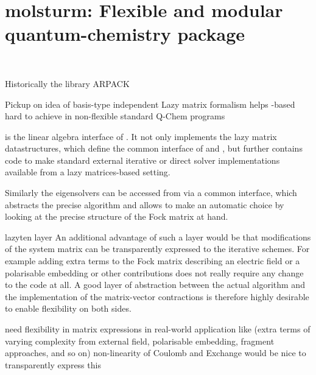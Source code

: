 \chapter{molsturm: Flexible and modular quantum-chemistry package}
\label{ch:Molsturm}
 \\

Historically the \fortran library ARPACK~\cite{Lehoucq1998}

Pickup on idea of basis-type independent \SCF
Lazy matrix formalism helps
\contraction-based \SCF hard to achieve in non-flexible standard
Q-Chem programs

\lazyten is the linear algebra interface of \molsturm.
It not only implements the lazy matrix datastructures,
which define the common interface of \gint and \gscf,
but further contains code to make standard external
iterative or direct solver implementations available
from a lazy matrices-based setting.

Similarly the eigensolvers can be accessed from \gscf via a common interface,
which abstracts the precise algorithm and allows \lazyten to make an automatic
choice by looking at the precise structure of the Fock matrix at hand.










lazyten layer
An additional advantage of such a layer would be that
modifications of the system matrix can be transparently expressed
to the iterative schemes.
For example adding extra terms to the Fock matrix
describing an electric field or a polarisable embedding
or other contributions does not really require
any change to the \SCF code at all.
A good layer of abstraction between the actual \SCF algorithm
and the implementation of the matrix-vector contractions
is therefore highly desirable to enable flexibility on both sides.

need flexibility in matrix expressions in real-world application
like \SCF (extra terms of varying complexity from external field,
polarisable embedding, fragment approaches, and so on)
non-linearity of Coulomb and Exchange
would be nice to transparently express this

